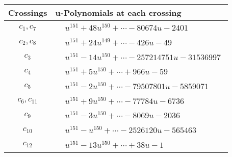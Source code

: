 \documentclass[1p]{elsarticle_modified}
\theoremstyle{definition}
\begin{document}
\begin{tabular}{m{50pt}|m{274pt}}
Crossings & \hspace{64pt}u-Polynomials at each crossing \\
\hline $$\begin{aligned}c_{1},c_{7}\end{aligned}$$&$\begin{aligned}
&u^{151}+48 u^{150}+\cdots-80674 u-2401
\end{aligned}$\\
\hline $$\begin{aligned}c_{2},c_{8}\end{aligned}$$&$\begin{aligned}
&u^{151}+24 u^{149}+\cdots-426 u-49
\end{aligned}$\\
\hline $$\begin{aligned}c_{3}\end{aligned}$$&$\begin{aligned}
&u^{151}-14 u^{150}+\cdots-257214751 u-31536997
\end{aligned}$\\
\hline $$\begin{aligned}c_{4}\end{aligned}$$&$\begin{aligned}
&u^{151}+5 u^{150}+\cdots+966 u-59
\end{aligned}$\\
\hline $$\begin{aligned}c_{5}\end{aligned}$$&$\begin{aligned}
&u^{151}-2 u^{150}+\cdots-79507801 u-5859071
\end{aligned}$\\
\hline $$\begin{aligned}c_{6},c_{11}\end{aligned}$$&$\begin{aligned}
&u^{151}+9 u^{150}+\cdots-77784 u-6736
\end{aligned}$\\
\hline $$\begin{aligned}c_{9}\end{aligned}$$&$\begin{aligned}
&u^{151}-3 u^{150}+\cdots-8069 u-2036
\end{aligned}$\\
\hline $$\begin{aligned}c_{10}\end{aligned}$$&$\begin{aligned}
&u^{151}- u^{150}+\cdots-2526120 u-565463
\end{aligned}$\\
\hline $$\begin{aligned}c_{12}\end{aligned}$$&$\begin{aligned}
&u^{151}-13 u^{150}+\cdots+38 u-1
\end{aligned}$\\
\hline
\end{tabular}\\~\\
\end{document}
